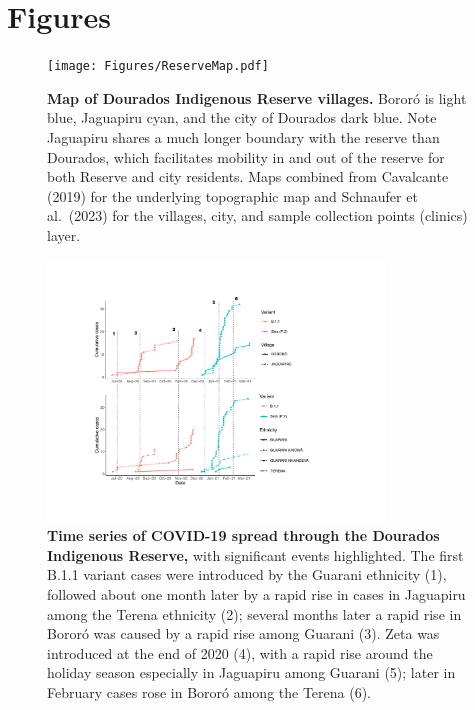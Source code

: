 \documentclass[
  letterpaper,
  abstract]{scrartcl}
\begin{document}
\section{Figures}

\begin{figure}[H]

\centering
\caption{\textbf{Map of Dourados Indigenous Reserve villages.} Bororó is light
blue, Jaguapiru cyan, and the city of Dourados dark blue. Note
Jaguapiru shares a much longer boundary with the reserve than Dourados,
which facilitates mobility in and out of the reserve for both Reserve
and city residents. Maps combined from Cavalcante (2019) for the underlying
topographic map and Schnaufer et al.~(2023) for the villages, city, and 
sample collection points (clinics) layer.}
\label{fig:Map}
\vspace{0.3em}
{\texttt{[image: Figures/ReserveMap.pdf]}}
\end{figure}%


\begin{figure}[H]
\caption{\textbf{Time series of COVID-19 spread through the Dourados Indigenous
Reserve,} with significant events highlighted. The first B.1.1 variant
cases were introduced by the Guarani ethnicity (1), followed about one
month later by a rapid rise in cases in Jaguapiru among the Terena
ethnicity (2); several months later a rapid rise in Bororó was caused by
a rapid rise among Guarani (3). Zeta was introduced at the end of 2020
(4), with a rapid rise around the holiday season especially in Jaguapiru
among Guarani (5); later in February cases rose in Bororó among the
Terena (6).}
\label{fig:DeOliveiraSeries}
\vspace{0.3em}
{\centering \includegraphics[width=0.8\textwidth,height=\textheight]{Figures/Time Series.pdf}

}
\end{figure}%
\end{document}

